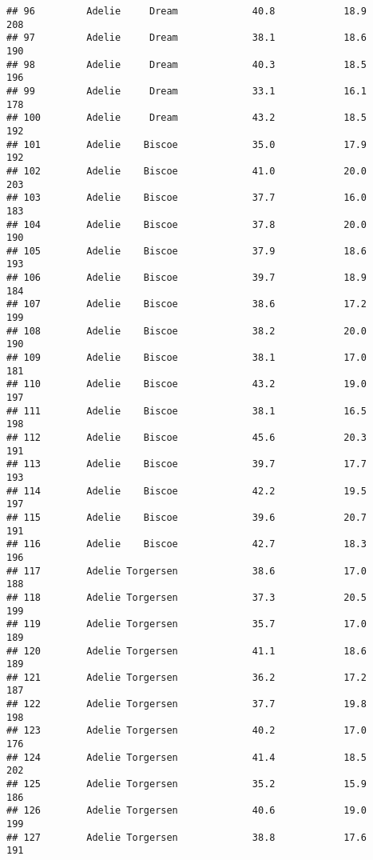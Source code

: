 \documentclass[
]{article}
\begin{document}
\begin{verbatim}
## 96         Adelie     Dream             40.8            18.9               208
## 97         Adelie     Dream             38.1            18.6               190
## 98         Adelie     Dream             40.3            18.5               196
## 99         Adelie     Dream             33.1            16.1               178
## 100        Adelie     Dream             43.2            18.5               192
## 101        Adelie    Biscoe             35.0            17.9               192
## 102        Adelie    Biscoe             41.0            20.0               203
## 103        Adelie    Biscoe             37.7            16.0               183
## 104        Adelie    Biscoe             37.8            20.0               190
## 105        Adelie    Biscoe             37.9            18.6               193
## 106        Adelie    Biscoe             39.7            18.9               184
## 107        Adelie    Biscoe             38.6            17.2               199
## 108        Adelie    Biscoe             38.2            20.0               190
## 109        Adelie    Biscoe             38.1            17.0               181
## 110        Adelie    Biscoe             43.2            19.0               197
## 111        Adelie    Biscoe             38.1            16.5               198
## 112        Adelie    Biscoe             45.6            20.3               191
## 113        Adelie    Biscoe             39.7            17.7               193
## 114        Adelie    Biscoe             42.2            19.5               197
## 115        Adelie    Biscoe             39.6            20.7               191
## 116        Adelie    Biscoe             42.7            18.3               196
## 117        Adelie Torgersen             38.6            17.0               188
## 118        Adelie Torgersen             37.3            20.5               199
## 119        Adelie Torgersen             35.7            17.0               189
## 120        Adelie Torgersen             41.1            18.6               189
## 121        Adelie Torgersen             36.2            17.2               187
## 122        Adelie Torgersen             37.7            19.8               198
## 123        Adelie Torgersen             40.2            17.0               176
## 124        Adelie Torgersen             41.4            18.5               202
## 125        Adelie Torgersen             35.2            15.9               186
## 126        Adelie Torgersen             40.6            19.0               199
## 127        Adelie Torgersen             38.8            17.6               191

\end{verbatim}
\end{document}
